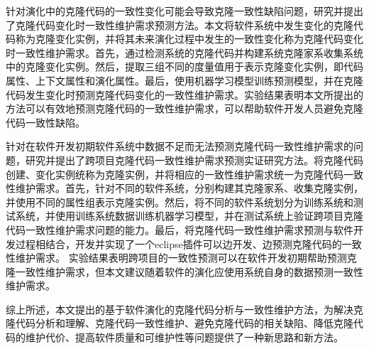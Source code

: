 {针对演化中的克隆代码的一致性变化可能会导致克隆一致性缺陷问题，研究并提出了克隆代码变化时一致性维护需求预测方法。本文将软件系统中发生变化的克隆代码称为克隆变化实例，并将其未来演化过程中发生的一致性变化称为克隆代码变化时一致性维护需求。首先，通过检测系统的克隆代码并构建系统克隆家系收集系统中的克隆变化实例。然后，提取三组不同的度量值用于表示克隆变化实例，即代码属性、上下文属性和演化属性。最后，使用机器学习模型训练预测模型，并在克隆代码发生变化时预测克隆代码变化的一致性维护需求。实验结果表明本文所提出的方法可以有效地预测克隆代码的一致性维护需求，可以帮助软件开发人员避免克隆代码一致性缺陷。

针对在软件开发初期软件系统中数据不足而无法预测克隆代码一致性维护需求的问题，研究并提出了跨项目克隆代码一致性维护需求预测实证研究方法。将克隆代码创建、变化实例统称为克隆实例，并将相应的一致性维护需求统一为克隆代码一致性维护需求。首先，针对不同的软件系统，分别构建其克隆家系、收集克隆实例，并使用不同的属性组表示克隆实例。然后，将不同的软件系统划分为训练系统和测试系统，并使用训练系统数据训练机器学习模型，并在测试系统上验证跨项目克隆代码一致性维护需求问题的能力。最后，将克隆代码一致性维护需求预测与软件开发过程相结合，开发并实现了一个eclipse插件可以边开发、边预测克隆代码的一致性维护需求。 实验结果表明跨项目的一致性预测可以在软件开发初期帮助预测克隆一致性维护需求，但本文建议随着软件的演化应使用系统自身的数据预测一致性维护需求。%

综上所述，本文提出的基于软件演化的克隆代码分析与一致性维护方法，为解决克隆代码分析和理解、克隆代码一致性维护、避免克隆代码的相关缺陷、降低克隆代码的维护代价、提高软件质量和可维护性等问题提供了一种新思路和新方法。
}


